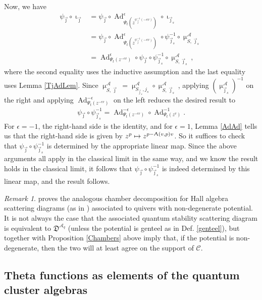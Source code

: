 \documentclass{amsart}
\DeclareMathOperator{\Ad}{Ad}
\let\f=\mathfrak
\let\s=\mathcal
\newcommand {\jj} {\vec{\jmath}}
\renewcommand{\iota}{\upiota}
\renewcommand{\Lambda}{\Uplambda}
\renewcommand{\mu}{\upmu}
\theoremstyle{plain}%
\theoremstyle{definition}
\theoremstyle{remark}
\newtheorem{rmk}[thm]{Remark}
\newenvironment{myproof}[1][\proofname]{\proof[#1]\mbox{}}{\endproof}
\begin{document}
\begin{myproof}[Proof of Proposition \ref{Chambers}]
Now, we have
\begin{align*}
    \psi_{\jj}\circ \iota_{\jj}&=\psi_{\jj}\circ \Ad^{\epsilon}_{\Psi_t(z^{\psi_{\jj}^{-1}(-\epsilon v)})} \circ \iota_{\jj_s} \\
    &= \psi_{\jj}\circ \Ad^{\epsilon}_{\Psi_t(z^{\psi_{\jj}^{-1}(-\epsilon v)})} \circ \psi_{\jj_s}^{-1}\circ \mu^{\s{A}}_{S,\jj_s} \\
    &= \Ad^{\epsilon}_{\Psi_t(z^{-\epsilon v})} \circ \psi_{\jj} \circ \psi_{\jj_s}^{-1}\circ \mu^{\s{A}}_{S,\jj_s},
\end{align*}
where the second equality uses the inductive assumption and the last equality uses Lemma \ref{TjAdLem}.  Since $\mu^{\s{A}}_{S,\jj}=\mu^{\s{A}}_{S_{\jj_s},j_s} \circ \mu^{\s{A}}_{S,\jj_s}$, applying $(\mu^{\s{A}}_{\jj_s})^{-1}$ on the right and applying $\Ad^{-\epsilon}_{\Psi_t(z^{-\epsilon v})}$ on the left reduces the desired result to
\begin{align*}
    \psi_{\jj}\circ \psi_{\jj_s}^{-1} = \Ad^{-\epsilon}_{\Psi_t(z^{-\epsilon v})} \circ \Ad^{-1}_{\Psi_t(z^v)}.
\end{align*}
For $\epsilon=-1$, the right-hand side is the identity, and for $\epsilon=1$, Lemma \ref{AdAd} tells us that the right-hand side is given by $z^p\mapsto z^{p-\Lambda(v,p)v}$.  So it suffices to check that $\psi_{\jj}\circ \psi_{\jj_s}^{-1}$ is determined by the appropriate linear map.  Since the above arguments all apply in the classical limit in the same way, and we know the result holds in the classical limit, it follows that $\psi_{\jj}\circ \psi_{\jj_s}^{-1}$ is indeed determined by this linear map, and the result follows.
\end{myproof}



\begin{rmk}
\cite{Mou} proves the analogous chamber decomposition for Hall algebra scattering diagrams (as in \cite{Bridge}) associated to quivers with non-degenerate potential.  It is not always the case that the associated quantum stability scattering diagram is equivalent to $\f{D}^{\s{A}_q}$ (unless the potential is genteel as in Def. \ref{genteel}), but \cite[Thm. 1.1]{Mou} together with Proposition \ref{Chambers} above imply that, if the potential is non-degenerate, then the two will at least agree on the support of $\s{C}$. \end{rmk}




\subsection{Theta functions as elements of the quantum cluster algebras}\label{thetas-in-clusters}
\end{document}
